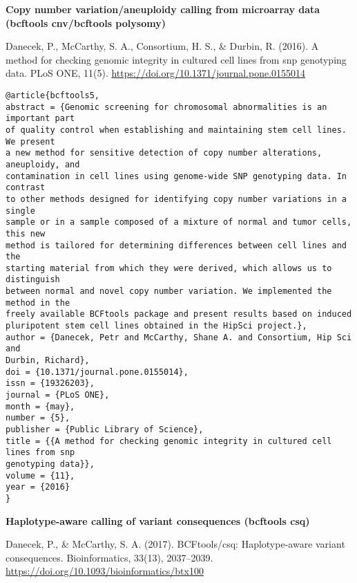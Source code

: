 \documentclass[]{article}
\begin{document}
\textbf{Copy number variation/aneuploidy calling from microarray data (bcftools cnv/bcftools polysomy)}


Danecek, P., McCarthy, S. A., Consortium, H. S., \& Durbin, R. (2016). A method for checking genomic integrity in cultured cell lines from snp genotyping data. PLoS ONE, 11(5). \url{https://doi.org/10.1371/journal.pone.0155014}

\begin{verbatim}
@article{bcftools5,
abstract = {Genomic screening for chromosomal abnormalities is an important part
of quality control when establishing and maintaining stem cell lines. We present
a new method for sensitive detection of copy number alterations, aneuploidy, and
contamination in cell lines using genome-wide SNP genotyping data. In contrast
to other methods designed for identifying copy number variations in a single
sample or in a sample composed of a mixture of normal and tumor cells, this new
method is tailored for determining differences between cell lines and the
starting material from which they were derived, which allows us to distinguish
between normal and novel copy number variation. We implemented the method in the
freely available BCFtools package and present results based on induced
pluripotent stem cell lines obtained in the HipSci project.},
author = {Danecek, Petr and McCarthy, Shane A. and Consortium, Hip Sci and
Durbin, Richard},
doi = {10.1371/journal.pone.0155014},
issn = {19326203},
journal = {PLoS ONE},
month = {may},
number = {5},
publisher = {Public Library of Science},
title = {{A method for checking genomic integrity in cultured cell lines from snp
genotyping data}},
volume = {11},
year = {2016}
}
\end{verbatim}

\textbf{Haplotype-aware calling of variant consequences (bcftools csq)}

Danecek, P., \& McCarthy, S. A. (2017). BCFtools/csq: Haplotype-aware variant consequences. Bioinformatics, 33(13), 2037–2039. \url{https://doi.org/10.1093/bioinformatics/btx100}
\end{document}
